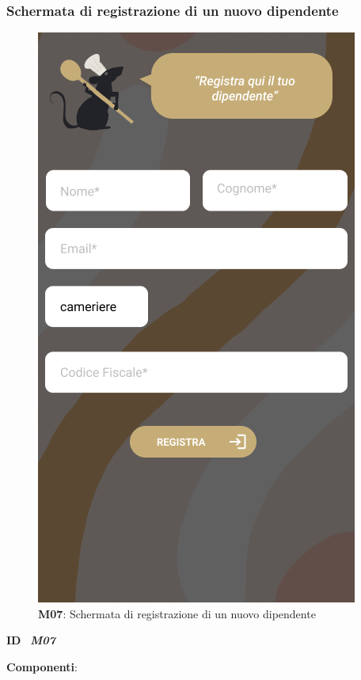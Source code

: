         \subsubsection{Schermata di registrazione di un nuovo dipendente}
        \begin{figure}[H]
            \centering
            \includegraphics[scale=0.35]{assets/Mockup/Mockup_SaveWorker.png}
            \caption{\textbf{M07}: Schermata di registrazione di un nuovo dipendente}\label{fig:Mockup_SaveWaiter}
        \end{figure}
        \begin{flushleft}
            \textbf{ID} \ \Large{\textit{\textbf{M07}}}
        \end{flushleft}
        \textbf{Componenti}:


